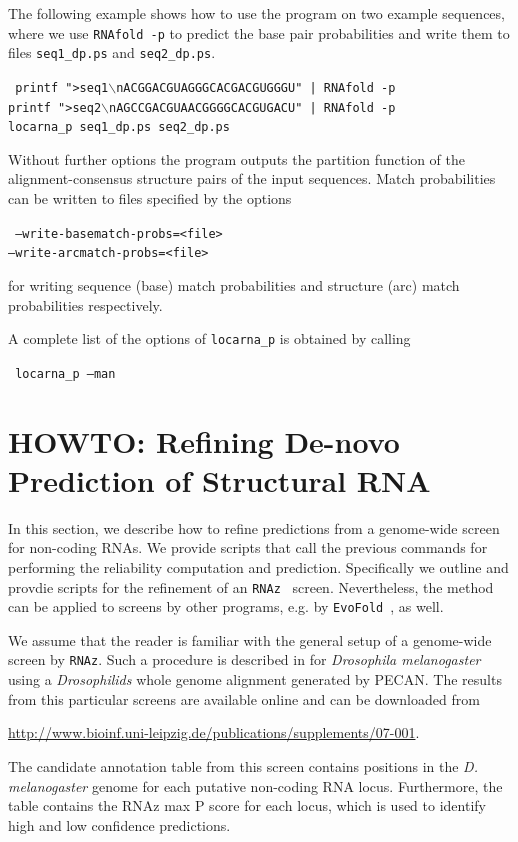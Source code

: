 \documentclass{article}
\newenvironment{ttbox}{%
  \begin{framed}\begin{minipage}{1.0\textwidth}\tt}%
{\end{minipage}\end{framed}\noindent}
\begin{document}
The following example shows how to use the program on two example
sequences, where we use \texttt{RNAfold -p} to predict the base pair
probabilities and write them to files \texttt{seq1\_dp.ps} and \texttt{seq2\_dp.ps}.
\begin{ttbox}
  printf ">seq1$\backslash{}$nACGGACGUAGGGCACGACGUGGGU" |  RNAfold -p\\
  printf ">seq2$\backslash{}$nAGCCGACGUAACGGGGCACGUGACU" |  RNAfold -p\\
  locarna\_p seq1\_dp.ps seq2\_dp.ps
\end{ttbox}
Without further options the program outputs the partition function of
the alignment-consensus structure pairs of the input sequences.
%
Match probabilities can be written to files specified by the options
\begin{ttbox}
--write-basematch-probs=<file>\\
--write-arcmatch-probs=<file>
\end{ttbox}
for writing sequence (base) match probabilities and structure (arc) match probabilities respectively.

A complete list of the options of \texttt{locarna\_p} is obtained by calling
\begin{ttbox}
  locarna\_p --man
\end{ttbox}

\section{HOWTO: Refining De-novo Prediction of Structural RNA}

In this section, we describe how to refine predictions from a
genome-wide screen for non-coding RNAs. We provide scripts that call
the previous commands for performing the reliability computation and
prediction. Specifically we outline and provdie scripts for the
refinement of an
\texttt{RNAz}~\cite{Washietl:Hofacker:Stadler:Fast_and_relia:PNAS2005,Washietl:Hofacker:Lukasser:Mappi_conse_RNA:2005}
screen. Nevertheless, the method can be applied to screens by other
programs, e.g. by
\texttt{EvoFold}~\cite{Pedersen:Bejerano:Siepel:Ident_and_Class:2006},
as well.

We assume that the reader is familiar with the general setup of a
genome-wide screen by \texttt{RNAz}. Such a procedure is described in
\cite{Rose:Hackermuller:Washietl:Compu_RNomi_droso:2007} for
\emph{Drosophila melanogaster} using a \emph{Drosophilids} whole
genome alignment generated by PECAN. The results from this particular
screens are available online and can be downloaded from
\begin{center}
  \url{http://www.bioinf.uni-leipzig.de/publications/supplements/07-001}.
\end{center}
The candidate annotation table from this screen contains positions in
the \emph{D. melanogaster} genome for each putative non-coding RNA
locus. Furthermore, the table contains the RNAz max P score for each
locus, which is used to identify high and low confidence predictions.
\end{document}

